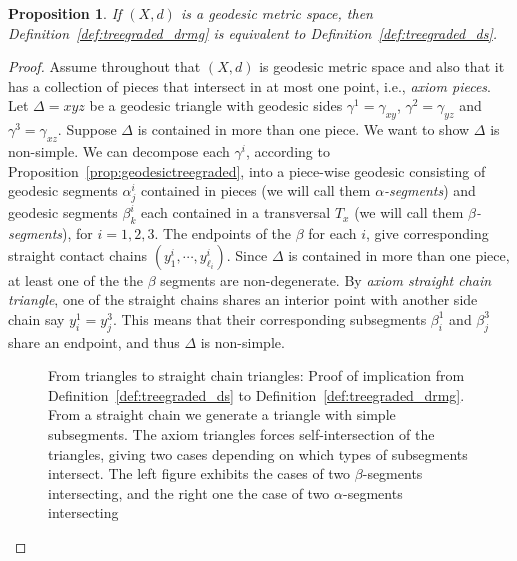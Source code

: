 \documentclass[12pt,article]{amsart}
\newcommand*{\svgfig}[1]{\Huge{}}
\numberwithin{equation}{section}
\numberwithin{figure}{section}
\newtheorem{proposition}[equation]{Proposition}
\theoremstyle{definition}
\theoremstyle{plain}
\begin{document}
\begin{proposition}
If $(X,d)$ is a geodesic metric space, then Definition~\ref{def:treegraded_drmg} is equivalent to Definition~\ref{def:treegraded_ds}.
\label{prop:eq_defs_treegraded}
\end{proposition}
\begin{proof}
Assume throughout that $(X,d)$ is geodesic metric space and also that it has a collection of pieces that intersect in at most one point, i.e., \emph{axiom pieces}.
Let $\Delta=xyz$ be a geodesic triangle with geodesic sides $\gamma^1=\gamma_{xy}$, $\gamma^2=\gamma_{yz}$ and $\gamma^3=\gamma_{xz}$.
Suppose $\Delta$ is contained in more than one piece.
We want to show $\Delta$ is non-simple.
We can decompose each $\gamma^i$, according to Proposition~\ref{prop:geodesictreegraded}, into a piece-wise geodesic consisting of geodesic segments $\alpha^i_j$ contained in pieces (we will call them \emph{$\alpha$-segments}) and geodesic segments $\beta^i_k$ each contained in a transversal $T_x$ (we will call them \emph{$\beta$-segments}), for $i=1,2,3$.
The endpoints of the $\beta$ for each $i$, give corresponding straight contact chains $(y^i_1,\cdots,y^i_{\ell_i})$.
Since $\Delta$ is contained in more than one piece, at least one of the the $\beta$ segments are non-degenerate.
  By \emph{axiom straight chain triangle}, one of the straight chains shares an interior point with another side chain say $y^1_i=y^3_j$. This means that their corresponding subsegments $\beta^1_i$ and $\beta^3_j$ share an endpoint, and thus $\Delta$ is non-simple.



\begin{figure}[htp]
     \centering
          \begin{subfigure}[b]{0.4\textwidth}
\centering{
\resizebox{80mm}{!}{\svgfig{triangle_case3}}
\label{fig:triangle_case3}
}
     \end{subfigure}
     \begin{subfigure}[b]{0.4\textwidth}

\centering{
\resizebox{80mm}{!}{\svgfig{triangle_case3bis}}
\label{fig:triangle_case3bis}
}
     \end{subfigure}


     \caption{From triangles to straight chain triangles: Proof of implication from Definition~\ref{def:treegraded_ds} to Definition~\ref{def:treegraded_drmg}. From a straight chain we generate a triangle with simple subsegments. The axiom triangles forces self-intersection of the triangles, giving two cases depending on which types of subsegments intersect. The left figure exhibits the cases of two $\beta$-segments intersecting, and the right one the case of two $\alpha$-segments intersecting }
     \label{fig:equivalence}
\end{figure}




\end{proof}
\end{document}
